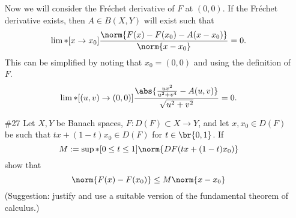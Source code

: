\documentclass[11pt, oneside]{article}
\begin{document}
\begin{enumerate}
    Now we will consider the Fr\'echet derivative of $F$ at $(0, 0)$.
    If the Fr\'echet derivative exists, then $A \in B(X, Y)$ will exist such
    that
    \[
      \lim*[x \to x_0]{\frac{\norm{F(x) - F(x_0) - A(x - x_0)}}{\norm{x - x_0}}} = 0.
    \]
    This can be simplified by noting that $x_0 = (0, 0)$ and using the
    definition of $F$.
    \[
      \lim*[(u, v) \to (0, 0)]{\frac{\abs{\frac{uv^2}{u^2 + v^4} - A(u, v)}}{\sqrt{u^2 + v^2}}} = 0.
    \]

  \pagebreak
  \item[\#27]
    Let $X, Y$ be Banach spaces, $F: D(F) \subset X \to Y$, and let
    $x, x_0 \in D(F)$ be such that $tx + (1 - t)x_0 \in D(F)$ for
    $t \in \br{0, 1}$.
    If
    \[
      M := \sup*[0 \le t \le 1]{\norm{DF(tx + (1 - t)x_0)}}
    \]
    show that
    \[
      \norm{F(x) - F(x_0)} \le M\norm{x - x_0}
    \]
    (Suggestion: justify and use a suitable version of the fundamental theorem
    of calculus.)
\end{enumerate}

\pagebreak
\end{document}
